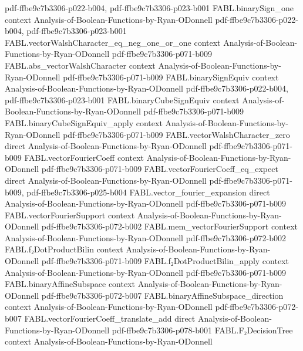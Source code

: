 \begin{theorem}
  {pdf-ffbe9c7b3306-p022-b004,
    pdf-ffbe9c7b3306-p023-b001}
\proofstep
  {FABL.binarySign_one}
  {context}
  {Analysis-of-Boolean-Functions-by-Ryan-ODonnell}
  {pdf-ffbe9c7b3306-p022-b004,
    pdf-ffbe9c7b3306-p023-b001}
\proofstep
  {FABL.vectorWalshCharacter_eq_neg_one_or_one}
  {context}
  {Analysis-of-Boolean-Functions-by-Ryan-ODonnell}
  {pdf-ffbe9c7b3306-p071-b009}
\proofstep
  {FABL.abs_vectorWalshCharacter}
  {context}
  {Analysis-of-Boolean-Functions-by-Ryan-ODonnell}
  {pdf-ffbe9c7b3306-p071-b009}
\proofstep
  {FABL.binarySignEquiv}
  {context}
  {Analysis-of-Boolean-Functions-by-Ryan-ODonnell}
  {pdf-ffbe9c7b3306-p022-b004,
    pdf-ffbe9c7b3306-p023-b001}
\proofstep
  {FABL.binaryCubeSignEquiv}
  {context}
  {Analysis-of-Boolean-Functions-by-Ryan-ODonnell}
  {pdf-ffbe9c7b3306-p071-b009}
\proofstep
  {FABL.binaryCubeSignEquiv_apply}
  {context}
  {Analysis-of-Boolean-Functions-by-Ryan-ODonnell}
  {pdf-ffbe9c7b3306-p071-b009}
\proofstep
  {FABL.vectorWalshCharacter_zero}
  {direct}
  {Analysis-of-Boolean-Functions-by-Ryan-ODonnell}
  {pdf-ffbe9c7b3306-p071-b009}
\proofstep
  {FABL.vectorFourierCoeff}
  {context}
  {Analysis-of-Boolean-Functions-by-Ryan-ODonnell}
  {pdf-ffbe9c7b3306-p071-b009}
\proofstep
  {FABL.vectorFourierCoeff_eq_expect}
  {direct}
  {Analysis-of-Boolean-Functions-by-Ryan-ODonnell}
  {pdf-ffbe9c7b3306-p071-b009,
    pdf-ffbe9c7b3306-p025-b004}
\proofstep
  {FABL.vector_fourier_expansion}
  {direct}
  {Analysis-of-Boolean-Functions-by-Ryan-ODonnell}
  {pdf-ffbe9c7b3306-p071-b009}
\proofstep
  {FABL.vectorFourierSupport}
  {context}
  {Analysis-of-Boolean-Functions-by-Ryan-ODonnell}
  {pdf-ffbe9c7b3306-p072-b002}
\proofstep
  {FABL.mem_vectorFourierSupport}
  {context}
  {Analysis-of-Boolean-Functions-by-Ryan-ODonnell}
  {pdf-ffbe9c7b3306-p072-b002}
\proofstep
  {FABL.f₂DotProductBilin}
  {context}
  {Analysis-of-Boolean-Functions-by-Ryan-ODonnell}
  {pdf-ffbe9c7b3306-p071-b009}
\proofstep
  {FABL.f₂DotProductBilin_apply}
  {context}
  {Analysis-of-Boolean-Functions-by-Ryan-ODonnell}
  {pdf-ffbe9c7b3306-p071-b009}
\proofstep
  {FABL.binaryAffineSubspace}
  {context}
  {Analysis-of-Boolean-Functions-by-Ryan-ODonnell}
  {pdf-ffbe9c7b3306-p072-b007}
\proofstep
  {FABL.binaryAffineSubspace_direction}
  {context}
  {Analysis-of-Boolean-Functions-by-Ryan-ODonnell}
  {pdf-ffbe9c7b3306-p072-b007}
\proofstep
  {FABL.vectorFourierCoeff_translate_add}
  {direct}
  {Analysis-of-Boolean-Functions-by-Ryan-ODonnell}
  {pdf-ffbe9c7b3306-p078-b001}
\proofstep
  {FABL.F₂DecisionTree}
  {context}
  {Analysis-of-Boolean-Functions-by-Ryan-ODonnell}

\end{theorem}
